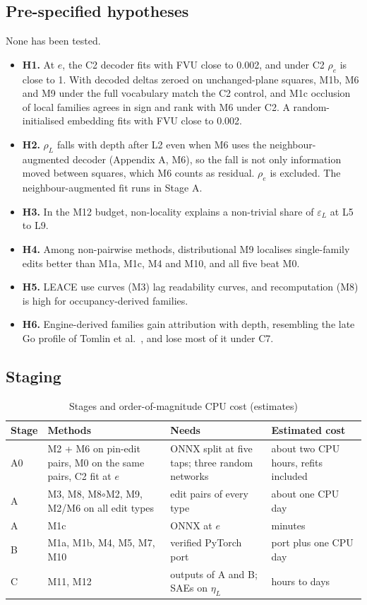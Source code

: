 \documentclass[conference]{IEEEtran}
\begin{document}
\subsection{Pre-specified hypotheses}\label{sec:10.3}
None has been tested.

\begin{itemize}
\item \textbf{H1.} At $e$, the C2 decoder fits with FVU close to 0.002, and under C2 $\rho_e$ is close to 1. With decoded deltas zeroed on unchanged-plane squares, M1b, M6 and M9 under the full vocabulary match the C2 control, and M1c occlusion of local families agrees in sign and rank with M6 under C2. A random-initialised embedding fits with FVU close to 0.002.
\item \textbf{H2.} $\rho_L$ falls with depth after L2 even when M6 uses the neighbour-augmented decoder (Appendix A, M6), so the fall is not only information moved between squares, which M6 counts as residual. $\rho_e$ is excluded. The neighbour-augmented fit runs in Stage A.
\item \textbf{H3.} In the M12 budget, non-locality explains a non-trivial share of $\varepsilon_L$ at L5 to L9.
\item \textbf{H4.} Among non-pairwise methods, distributional M9 localises single-family edits better than M1a, M1c, M4 and M10, and all five beat M0.
\item \textbf{H5.} LEACE use curves (M3) lag readability curves, and recomputation (M8) is high for occupancy-derived families.
\item \textbf{H6.} Engine-derived families gain attribution with depth, resembling the late Go profile of Tomlin et al.~\cite{tomlin2022}, and lose most of it under C7.
\end{itemize}

\subsection{Staging}\label{sec:10.4}
\begin{table}[!t]
\centering
\renewcommand{\thetable}{4}
\caption{Stages and order-of-magnitude CPU cost (estimates)}
\label{tab:4}
\footnotesize
\begin{tabularx}{\textwidth}{l>{\raggedright\arraybackslash}X>{\raggedright\arraybackslash}X>{\raggedright\arraybackslash}p{3.4cm}}
\toprule
Stage & Methods & Needs & Estimated cost \\
\midrule
A0 & M2 + M6 on pin-edit pairs, M0 on the same pairs, C2 fit at $e$ & ONNX split at five taps; three random networks & about two CPU hours, refits included \\
A & M3, M8, M8$\circ$M2, M9, M2/\allowbreak{}M6 on all edit types & edit pairs of every type & about one CPU day \\
A & M1c & ONNX at $e$ & minutes \\
B & M1a, M1b, M4, M5, M7, M10 & verified PyTorch port & port plus one CPU day \\
C & M11, M12 & outputs of A and B; SAEs on $\eta_L$ & hours to days \\
\bottomrule
\end{tabularx}
\end{table}
\end{document}

